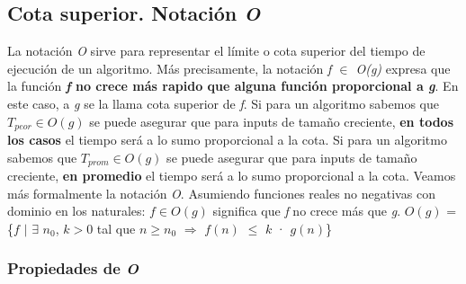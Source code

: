 \documentclass[10pt,a4paper]{article}
\begin{document}
\subsection{Cota superior. Notación \textit{O}}

La notación \textit{O} sirve para representar el límite o cota superior del tiempo de ejecución de un algoritmo.
\newline
\newline
Más precisamente, la notación \textit{f $\in$ O(g)} expresa que la función \textbf{\textit{f} no crece más rapido que alguna función proporcional a \textit{g}}.
\newline
\newline
En este caso, a \textit{g} se la llama cota superior de \textit{f}.
\newline
\newline
Si para un algoritmo sabemos que $T_{peor} \in O(g)$ se puede asegurar que para inputs de tamaño creciente, \textbf{en todos los casos} el tiempo será a lo sumo proporcional a la cota.
\newline
\newline
Si para un algoritmo sabemos que $T_{prom} \in O(g)$ se puede asegurar que para inputs de tamaño creciente, \textbf{en promedio} el tiempo será a lo sumo proporcional a la cota.
\newline
\newline
Veamos más formalmente la notación \textit{O}.
\newline
\newline
Asumiendo funciones reales no negativas con dominio en los naturales:
\newline
\newline
$f \in O(g)$ significa que \textit{f} no crece más que \textit{g}.  
\newline
\newline
$O(g)$ = \{$f$ $|$ $\exists$ $n_{0}$, $k > 0$ tal que $n \geq n_{0}$ $\Rightarrow$ $f(n)$ $\leq$ $k$ · $g(n)$\} 

\subsubsection{Propiedades de \textit{O}}
\end{document}
